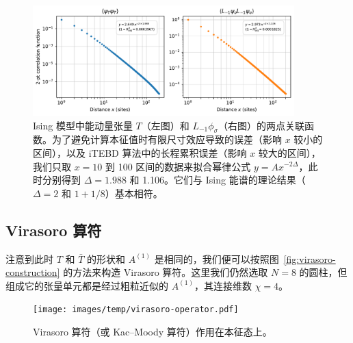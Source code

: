 \begin{figure}[ht]
  \centering
  \includegraphics[width=0.9\textwidth]{images/fibonacci/ising-correlation-function.pdf}
  \caption[Ising 模型中的两点关联函数]{Ising 模型中能动量张量 $T$（左图）和 $L_{-1}\phi_\sigma$（右图）的两点关联函数。为了避免计算本征值时有限尺寸效应导致的误差（影响 $x$ 较小的区间），以及 iTEBD 算法中的长程累积误差（影响 $x$ 较大的区间），我们只取 $x=10$ 到 100 区间的数据来拟合幂律公式 $y=Ax^{-2\Delta}$，此时分别得到 $\Delta=1.988$ 和 1.106。它们与 Ising 能谱的理论结果（$\Delta=2$ 和 $1+1/8$）基本相符。}
  \label{fig:ising-correlation-functions}
\end{figure}

\subsection{Virasoro 算符}
\label{subsec:ising-virasoro-operator}

注意到此时 $T$ 和 $\bar{T}$ 的形状和 $A^{(1)}$ 是相同的，我们便可以按照图~\ref{fig:virasoro-construction} 的方法来构造 Virasoro 算符。这里我们仍然选取 $N=8$ 的圆柱，但组成它的张量单元都是经过粗粒近似的 $A^{(1)}$，其连接维数 $\chi=4$。

\begin{figure}[ht]
  \centering
  \texttt{[image: images/temp/virasoro-operator.pdf]}
  \caption[Virasoro 算符作用在本征态上]{Virasoro 算符（或 Kac--Moody 算符）作用在本征态上。}
  \label{fig:virasoro-operator}
\end{figure}

